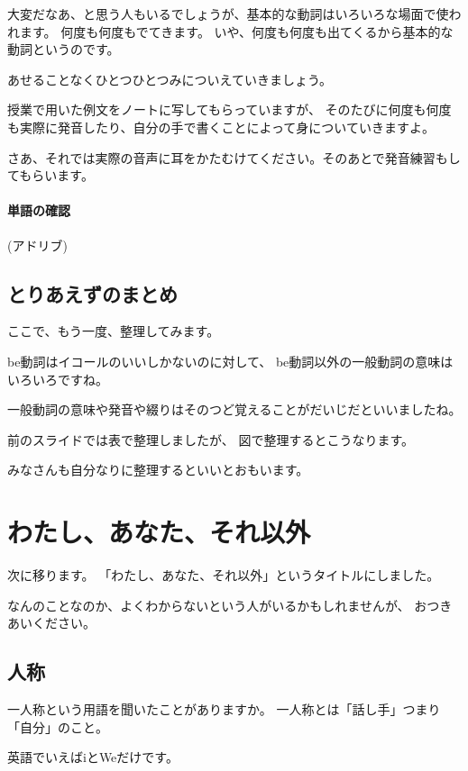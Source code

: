 \documentclass[book,jafontscale=0.9247]{jlreq}
\newcommand{\myMouse}{%
  {\large \ComputerMouse}
}
\begin{document}
大変だなあ、と思う人もいるでしょうが、基本的な動詞はいろいろな場面で使われます。
何度も何度もでてきます。
いや、何度も何度も出てくるから基本的な動詞というのです。

あせることなくひとつひとつみについえていきましょう。

授業で用いた例文をノートに写してもらっていますが、
そのたびに何度も何度も実際に発音したり、自分の手で書くことによって身についていきますよ。

さあ、それでは実際の音声に耳をかたむけてください。そのあとで発音練習もしてもらいます。

\paragraph{単語の確認}

(アドリブ)

\myMouse

\subsection{とりあえずのまとめ}

ここで、もう一度、整理してみます。

be動詞はイコールのいいしかないのに対して、
be動詞以外の一般動詞の意味はいろいろですね。

一般動詞の意味や発音や綴りはそのつど覚えることがだいじだといいましたね。

\myMouse

前のスライドでは表で整理しましたが、
図で整理するとこうなります。

みなさんも自分なりに整理するといいとおもいます。

\section{わたし、あなた、それ以外}

次に移ります。
「わたし、あなた、それ以外」というタイトルにしました。

なんのことなのか、よくわからないという人がいるかもしれませんが、
おつきあいください。

\subsection{人称}

一人称という用語を聞いたことがありますか。
一人称とは「話し手」つまり「自分」のこと。

英語でいえばiとWeだけです。
\end{document}

